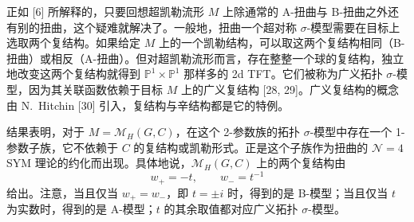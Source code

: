 \documentclass[11pt,a4paper,UTF8]{ctexart}
\begin{document}


正如 [6] 所解释的，只要回想超凯勒流形 $M$ 上除通常的 A-扭曲与 B-扭曲之外还有别的扭曲，这个疑难就解决了。一般地，扭曲一个超对称 $\sigma$-模型需要在目标上选取两个复结构。如果给定 $M$ 上的一个凯勒结构，可以取这两个复结构相同（B-扭曲）或相反（A-扭曲）。但对超凯勒流形而言，存在整整一个球的复结构，独立地改变这两个复结构就得到 $\mathbb{P}^{1}\times\mathbb{P}^{1}$ 那样多的 2d TFT。它们被称为广义拓扑 $\sigma$-模型，因为其关联函数依赖于目标 $M$ 上的广义复结构 [28, 29]。广义复结构的概念由 N.~Hitchin [30] 引入，复结构与辛结构都是它的特例。

结果表明，对于 $M=\mathcal{M}_{H}(G,C)$，在这个 2-参数族的拓扑 $\sigma$-模型中存在一个 1-参数子族，它不依赖于 $C$ 的复结构或凯勒形式。正是这个子族作为扭曲的 $\mathcal{N}=4$ SYM 理论的约化而出现。具体地说，$\mathcal{M}_{H}(G,C)$ 上的两个复结构由
\[
    w_{+}=-t,\qquad w_{-}=t^{-1}
\]
给出。注意，当且仅当 $w_{+}=w_{-}$，即 $t=\pm i$ 时，得到的是 B-模型；当且仅当 $t$ 为实数时，得到的是 A-模型；$t$ 的其余取值都对应广义拓扑 $\sigma$-模型。

\end{document}
